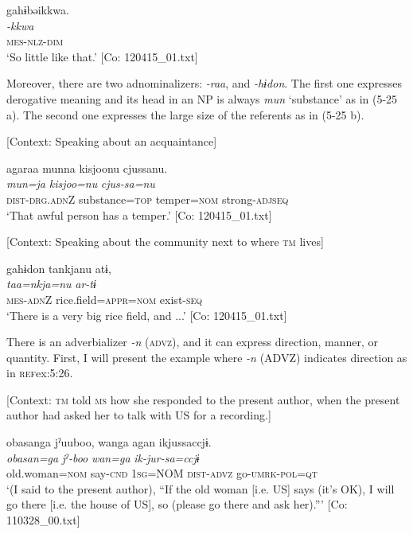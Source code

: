 \glll  gahɨbəikkwa.\\
\textit{-kkwa}\\
\textsc{mes}-\textsc{nlz}-\textsc{dim}\\
\glt ‘So little like that.’ [Co: 120415\_01.txt]
\z
\z

  Moreover, there are two adnominalizers: \textit{{}-raa}, and \textit{{}-hɨdon}. The first one expresses derogative meaning and its head in an NP is always \textit{mun} ‘substance’ as in (5-25 a). The second one expresses the large size of the referents as in (5-25 b).

\ea \label{ex:5:25}  \ea \label{ex:5:25a} [Context: Speaking about an acquaintance]

\glll  agaraa  munna  kisjoonu  cjussanu.\\
\textit{}  \textit{mun=ja}  \textit{kisjoo=nu}  \textit{cjus-sa=nu}\\
\textsc{dist}-\textsc{drg}.\textsc{adn}Z  substance=\textsc{top}  temper=\textsc{nom}  strong-\textsc{adj}\textsc{seq}\\
\glt ‘That awful person has a temper.’ [Co: 120415\_01.txt]

 \ex \label{ex:5:b} [Context: Speaking about the community next to where \textsc{tm} lives]

\glll  gahɨdon  tankjanu  atɨ,\\
\textit{}  \textit{taa=nkja=nu}  \textit{ar-tɨ}\\
\textsc{mes}-\textsc{adn}Z  rice.field=\textsc{appr}=\textsc{nom}  exist-\textsc{seq}\\
\glt ‘There is a very big rice field, and ...’ [Co: 120415\_01.txt]
\z
\z

  There is an adverbializer \textit{-n} (\textsc{advz}), and it can express direction, manner, or quantity. First, I will present the example where \textit{{}-n} (ADVZ) indicates direction as in \textsc{ref}{ex:5:26}.

\ea \label{ex:5:26}   [Context: \textsc{tm} told \textsc{ms} how she responded to the present author, when the present author had asked her to talk with US for a recording.]

\glll  {\textbar}obasan{\textbar}ga  jˀuuboo,  wanga  agan  ikjussaccjɨ.\\
\textit{obasan=ga}  \textit{jˀ-boo}  \textit{wan=ga}  \textit{}  \textit{ik-jur-sa=ccjɨ}\\
old.woman=\textsc{nom}  say-\textsc{cnd}  1\textsc{sg}=NOM  \textsc{dist}-\textsc{advz}  go-\textsc{umrk}-\textsc{pol}=\textsc{qt}\\
\glt ‘(I said to the present author), “If the old woman [i.e. US] says (it’s OK), I will go there [i.e. the house of US], so (please go there and ask her).”’ [Co: 110328\_00.txt]
\z

